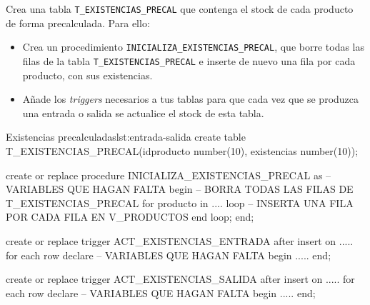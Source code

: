 \begin{homeworkProblem}

Crea una tabla \texttt{T\_EXISTENCIAS\_PRECAL} que contenga el stock de cada producto de forma precalculada. Para ello:
 
  \begin{itemize}
  \item Crea un procedimiento \texttt{INICIALIZA\_EXISTENCIAS\_PRECAL}, que borre todas las filas de la tabla \texttt{T\_EXISTENCIAS\_PRECAL} e inserte de nuevo una fila por cada producto, con sus existencias.
  \item Añade los \textit{triggers} necesarios a tus tablas para que cada vez que se produzca una entrada o salida se actualice el stock de esta tabla.
  \end{itemize}

  
\begin{listadosql}{Existencias precalculadas}{lst:entrada-salida}
create table T_EXISTENCIAS_PRECAL(idproducto number(10), existencias number(10));

create or replace procedure INICIALIZA_EXISTENCIAS_PRECAL
as
  -- VARIABLES QUE HAGAN FALTA
begin
  -- BORRA TODAS LAS FILAS DE T_EXISTENCIAS_PRECAL
  for producto in .... loop
     -- INSERTA UNA FILA POR CADA FILA EN V_PRODUCTOS
  end loop;
end; 

create or replace trigger ACT_EXISTENCIAS_ENTRADA 
after insert on .....
for each row 
declare
  -- VARIABLES QUE HAGAN FALTA
begin
  .....
end;

create or replace trigger ACT_EXISTENCIAS_SALIDA
after insert on .....
for each row 
declare
  -- VARIABLES QUE HAGAN FALTA
begin
  .....
end;


  \end{listadosql}

\end{homeworkProblem}

